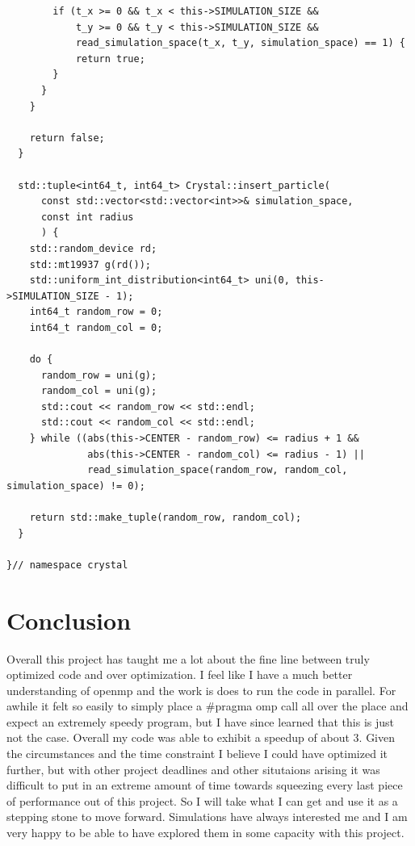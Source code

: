 \documentclass[11pt]{article}
\begin{document}
\begin{lstlisting}
        if (t_x >= 0 && t_x < this->SIMULATION_SIZE &&
            t_y >= 0 && t_y < this->SIMULATION_SIZE &&
            read_simulation_space(t_x, t_y, simulation_space) == 1) {
            return true;
        }
      }
    }

    return false;
  }

  std::tuple<int64_t, int64_t> Crystal::insert_particle(
      const std::vector<std::vector<int>>& simulation_space,
      const int radius
      ) {
    std::random_device rd;
    std::mt19937 g(rd());
    std::uniform_int_distribution<int64_t> uni(0, this->SIMULATION_SIZE - 1);
    int64_t random_row = 0;
    int64_t random_col = 0;

    do {
      random_row = uni(g);
      random_col = uni(g);
      std::cout << random_row << std::endl;
      std::cout << random_col << std::endl;
    } while ((abs(this->CENTER - random_row) <= radius + 1 &&
              abs(this->CENTER - random_col) <= radius - 1) ||
              read_simulation_space(random_row, random_col, simulation_space) != 0);

    return std::make_tuple(random_row, random_col);
  }

}// namespace crystal
\end{lstlisting}

\section{Conclusion}
Overall this project has taught me a lot about the fine line between truly optimized code and over optimization. I feel like I have a much better understanding of openmp and the work is does to run the code in parallel. For awhile it felt so easily to simply place a \#pragma omp call all over the place and expect an extremely speedy program, but I have since learned that this is just not the case. Overall my code was able to exhibit a speedup of about 3. Given the circumstances and the time constraint I believe I could have optimized it further, but with other project deadlines and other situtaions arising it was difficult to put in an extreme amount of time towards squeezing every last piece of performance out of this project. So I will take what I can get and use it as a stepping stone to move forward. Simulations have always interested me and I am very happy to be able to have explored them in some capacity with this project.
\end{document}
